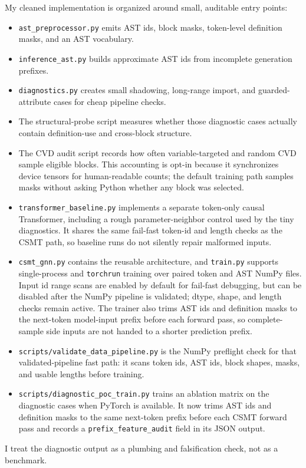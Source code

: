 \documentclass[10pt]{article}
\begin{document}
My cleaned implementation is organized around small, auditable entry points:
\begin{itemize}
  \item \texttt{ast\_preprocessor.py} emits AST ids, block masks, token-level
  definition masks, and an AST vocabulary.
  \item \texttt{inference\_ast.py} builds approximate AST ids from incomplete
  generation prefixes.
  \item \texttt{diagnostics.py} creates small shadowing, long-range import, and
  guarded-attribute cases for cheap pipeline checks.
  \item The structural-probe script measures whether those diagnostic cases
  actually contain definition-use and cross-block structure.
  \item The CVD audit script records how often variable-targeted and random CVD
  sample eligible blocks.  This accounting is opt-in because it synchronizes
  device tensors for human-readable counts; the default training path samples
  masks without asking Python whether any block was selected.
  \item \texttt{transformer\_baseline.py} implements a separate token-only
  causal Transformer, including a rough parameter-neighbor control used by the
  tiny diagnostics.  It shares the same fail-fast token-id and length checks as
  the CSMT path, so baseline runs do not silently repair malformed inputs.
  \item \texttt{csmt\_gnn.py} contains the reusable architecture, and
  \texttt{train.py} supports single-process and \texttt{torchrun} training over
  paired token and AST NumPy files.  Input id range scans are enabled by
  default for fail-fast debugging, but can be disabled after the NumPy pipeline
  is validated; dtype, shape, and length checks remain active.  The trainer also
  trims AST ids and definition masks to the next-token model-input prefix before
  each forward pass, so complete-sample side inputs are not handed to a shorter
  prediction prefix.
  \item \texttt{scripts/validate\_data\_pipeline.py} is the NumPy preflight
  check for that validated-pipeline fast path: it scans token ids, AST ids,
  block shapes, masks, and usable lengths before training.
  \item \texttt{scripts/diagnostic\_poc\_train.py} trains an ablation matrix on
  the diagnostic cases when PyTorch is available.  It now trims AST ids and
  definition masks to the same next-token prefix before each CSMT forward pass
  and records a \texttt{prefix\_feature\_audit} field in its JSON output.
\end{itemize}
I treat the diagnostic output as a plumbing and falsification check, not as a
benchmark.
\end{document}
